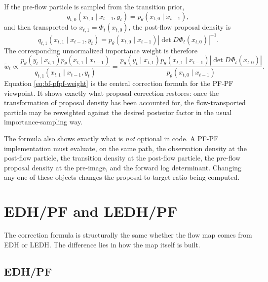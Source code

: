 If the pre-flow particle is sampled from the transition prior,
\begin{equation}
\label{eq:bf-pfpf-preflo-prior}
  q_{t,0}(x_{t,0} \mid x_{t-1}, y_t)
  = p_\theta(x_{t,0} \mid x_{t-1}),
\end{equation}
and then transported to $x_{t,1}=\Phi_t(x_{t,0})$, the post-flow proposal
density is
\begin{equation}
\label{eq:bf-pfpf-postflow-prior}
  q_{t,1}(x_{t,1} \mid x_{t-1}, y_t)
  = p_\theta(x_{t,0} \mid x_{t-1})
    \left|\det D\Phi_t(x_{t,0})\right|^{-1}.
\end{equation}
The corresponding unnormalized importance weight is therefore
\begin{equation}
\label{eq:bf-pfpf-weight}
  \tilde w_t
  \propto
  \frac{p_\theta(y_t \mid x_{t,1})
        p_\theta(x_{t,1} \mid x_{t-1})}
       {q_{t,1}(x_{t,1} \mid x_{t-1}, y_t)}
  =
  \frac{p_\theta(y_t \mid x_{t,1})
        p_\theta(x_{t,1} \mid x_{t-1})
        \left|\det D\Phi_t(x_{t,0})\right|}
       {p_\theta(x_{t,0} \mid x_{t-1})}.
\end{equation}
Equation \eqref{eq:bf-pfpf-weight} is the central correction formula for the
PF-PF viewpoint.  It shows exactly what proposal correction restores: once the
transformation of proposal density has been accounted for, the flow-transported
particle may be reweighted against the desired posterior factor in the usual
importance-sampling way.

The formula also shows exactly what is \emph{not} optional in code.  A PF-PF
implementation must evaluate, on the same path, the observation density at the
post-flow particle, the transition density at the post-flow particle, the
pre-flow proposal density at the pre-image, and the forward log determinant.
Changing any one of these objects changes the proposal-to-target ratio being
computed.

\section{EDH/PF and LEDH/PF}
\label{sec:bf-pfpf-edh-ledh}

The correction formula is structurally the same whether the flow map comes from
EDH or LEDH.  The difference lies in how the map itself is built.

\subsection{EDH/PF}

